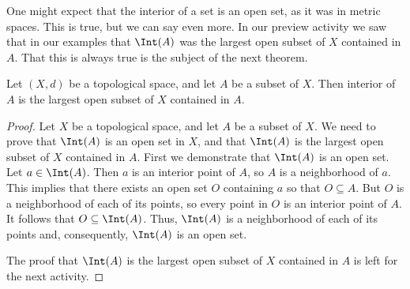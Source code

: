\begin{comment}
Finally, we will prove that $\Int(A)\cap \Int(B) = \Int(A \cap B)$. Let $x \in \Int(A) \cap \Int(B) $. Then $x \in \Int(A)$ and $x \in \Int(B)$. So there exist open sets $O_A$ in $A$ and $O_B$ in $B$ such that $x \in O_A$ and $x \in O_B$. From this we have that $O = O_A \cap O_B$ is an open set contained in $A \cap B$ and $x \in O$. Thus, $x \in \Int(A \cap B)$. So $\Int(A)\cap \Int(B) \subseteq  \Int(A \cap B)$.

Now suppose that $x \in \Int(A \cap B)$. Then there is an open set $O$ in $A \cap B$ with $x \in O$. But $O \subseteq A$ and $O \subseteq B$, so $x \in \Int(A)$ and $x \in \Int(B)$. It follows that $x \in \Int(A) \cap \Int(B)$. So $\Int(A \cap B) \subseteq  \Int(A)\cap \Int(B)$. These two inclusions show that  $\Int(A \cap B) = \Int(A)\cap \Int(B)$.

\ee

\end{comment}


One might expect that the interior of a set is an open set, as it was in metric spaces. This is true, but we can say even more. In our preview activity we saw that in our examples that $\Int(A)$ was the largest open subset of $X$ contained in $A$. That this is always true is the subject of the next theorem. 

\begin{theorem} \label{thm:Interior} Let $(X,d)$ be a topological space, and let $A$ be a subset of $X$. Then interior of $A$ is the largest open subset of $X$ contained in $A$.  
\end{theorem}

\begin{proof} Let $X$ be a topological space, and let $A$ be a subset of $X$. We need to prove that $\Int(A)$ is an open set in $X$, and that $\Int(A)$ is the largest open subset of $X$ contained in $A$. First we demonstrate that $\Int(A)$ is an open set. Let $a \in \Int(A)$. Then $a$ is an interior point of $A$, so $A$ is a neighborhood of $a$. This implies that there exists an open set $O$ containing $a$ so that $O \subseteq A$. But $O$ is a neighborhood of each of its points, so every point in $O$ is an interior point of $A$. It follows that $O \subseteq \Int(A)$. Thus, $\Int(A)$ is a neighborhood of each of its points and, consequently, $\Int(A)$ is an open set. 

The proof that $\Int(A)$ is the largest open subset of $X$ contained in $A$ is left for the next activity.
\end{proof}

